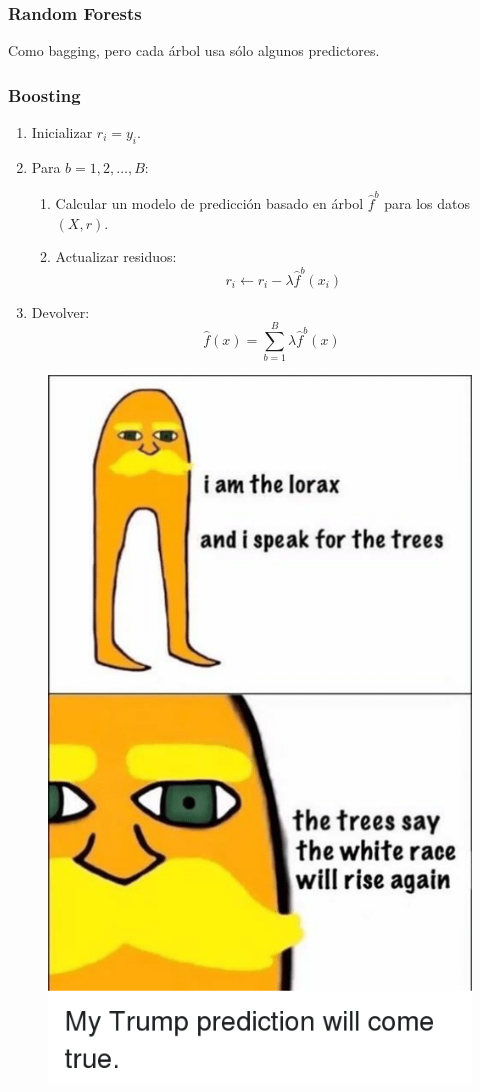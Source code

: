 \documentclass{beamer}
\theoremstyle{definition}
\begin{document}
\begin{frame}
\frametitle{Random Forests}
Como bagging, pero cada árbol usa sólo algunos predictores.
\end{frame}

\begin{frame}
\frametitle{Boosting}
\begin{enumerate}
	\item<1-> Inicializar $r_i = y_i$.
	\item<2-> Para $b=1,2,\dots,B$:
	\begin{enumerate}
		\item Calcular un modelo de predicción basado en árbol $\widehat{f}^b$ para los datos $(X,r)$.
		\item Actualizar residuos:
		\[ r_i \leftarrow r_i - \lambda \widehat{f}^b(x_i) \]
	\end{enumerate}
	\item<3-> Devolver:
	\[ \widehat{f}(x) = \sum_{b=1}^B \lambda \widehat{f}^b(x) \]
\end{enumerate}
\end{frame}



\begin{frame}
\begin{figure}[h!]
\includegraphics[scale=0.25]{lorax}
\end{figure}
\end{frame}
\end{document}
